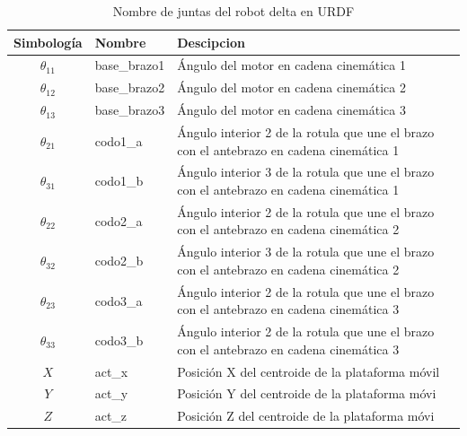         \begingroup
            \renewcommand{\arraystretch}{1.6}
            \begin{table}[H]
                \centering
                \begin{tabular}{c m{2.5cm} m{8cm}}
                   \hline                   
                   \textbf{Simbología}  &  \textbf{Nombre}  & \textbf{Descipcion}    \\\hline \hline 
                   $\theta_{11}$  & base\_brazo1    & Ángulo del motor en cadena cinemática 1                       \\\hline
                   $\theta_{12}$  & base\_brazo2    & Ángulo del motor en cadena cinemática 2                            \\\hline
                   $\theta_{13}$  & base\_brazo3    & Ángulo del motor en cadena cinemática 3                            \\\hline
                   $\theta_{21}$  & codo1\_a    & Ángulo interior 2 de la rotula que une el brazo con el antebrazo en cadena cinemática 1                       \\\hline
                   $\theta_{31}$  & codo1\_b    & Ángulo interior 3 de la rotula que une el brazo con el antebrazo en cadena cinemática 1                       \\\hline
                   $\theta_{22}$  & codo2\_a    & Ángulo interior 2 de la rotula que une el brazo con el antebrazo en cadena cinemática 2                       \\\hline
                   $\theta_{32}$  & codo2\_b    & Ángulo interior 3 de la rotula que une el brazo con el antebrazo en cadena cinemática 2                       \\\hline
                   $\theta_{23}$  & codo3\_a    & Ángulo interior 2 de la rotula que une el brazo con el antebrazo en cadena cinemática 3                       \\\hline
                   $\theta_{33}$  & codo3\_b    & Ángulo interior 2 de la rotula que une el brazo con el antebrazo en cadena cinemática 3                       \\\hline
                   $X$  & act\_x    & Posición X del centroide de la plataforma móvil                       \\\hline
                   $Y$  & act\_y    & Posición Y del centroide de la plataforma móvi                       \\\hline
                   $Z$  & act\_z    & Posición Z del centroide de la plataforma móvi                       \\\hline                  

                \end{tabular}
                \caption{Nombre de juntas del robot delta en URDF}
                \label{tab:cap6_rviz_1}
            \end{table}
        \endgroup

